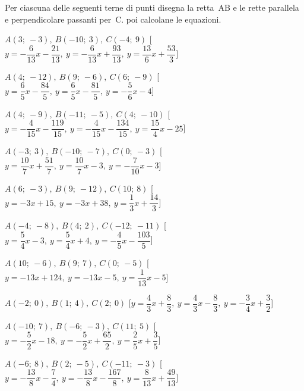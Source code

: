 \begin{esercizio}\label{ese:}
 Per ciascuna delle seguenti terne di 
punti disegna la retta~AB e le rette parallela e perpendicolare passanti 
per~C. poi calcolane le equazioni.
 \begin{enumeratea}
  \item  $A(3;~-3),~B(-10;~3),~C(-4;~9)$ \hfill 
   [$y = -\dfrac{6}{13} x -\dfrac{21}{13},~y = -\dfrac{6}{13} x 
+\dfrac{93}{13},~y = \dfrac{13}{6} x +\dfrac{53}{3}$]
  \item  $A(4;~-12),~B(9;~-6),~C(6;~-9)$ \hfill 
   [$y = \dfrac{6}{5} x -\dfrac{84}{5},~y = \dfrac{6}{5} x -\dfrac{81}{5},~y = 
-\dfrac{5}{6} x -4$]
  \item  $A(4;~-9),~B(-11;~-5),~C(4;~-10)$ \hfill 
   [$y = -\dfrac{4}{15} x -\dfrac{119}{15},~y = -\dfrac{4}{15} x 
-\dfrac{134}{15},~y = \dfrac{15}{4} x -25$]
  \item  $A(-3;~3),~B(-10;~-7),~C(0;~-3)$ \hfill 
   [$y = \dfrac{10}{7} x +\dfrac{51}{7},~y = \dfrac{10}{7} x -3,~y = 
-\dfrac{7}{10} x -3$]
  \item  $A(6;~-3),~B(9;~-12),~C(10;~8)$ \hfill 
   [$y = -3 x +15,~y = -3 x +38,~y = \dfrac{1}{3} x +\dfrac{14}{3}$]
  \item  $A(-4;~-8),~B(4;~2),~C(-12;~-11)$ \hfill 
   [$y = \dfrac{5}{4} x -3,~y = \dfrac{5}{4} x +4,~y = -\dfrac{4}{5} x 
-\dfrac{103}{5}$]
  \item  $A(10;~-6),~B(9;~7),~C(0;~-5)$ \hfill 
   [$y = -13 x +124,~y = -13 x -5,~y = \dfrac{1}{13} x -5$]
  \item  $A(-2;~0),~B(1;~4),~C(2;~0)$ \hfill 
   [$y = \dfrac{4}{3} x +\dfrac{8}{3},~y = \dfrac{4}{3} x -\dfrac{8}{3},~y = 
-\dfrac{3}{4} x +\dfrac{3}{2}$]
  \item  $A(-10;~7),~B(-6;~-3),~C(11;~5)$ \hfill 
   [$y = -\dfrac{5}{2} x -18,~y = -\dfrac{5}{2} x +\dfrac{65}{2},~y = 
\dfrac{2}{5} x +\dfrac{3}{5}$]
  \item  $A(-6;~8),~B(2;~-5),~C(-11;~-3)$ \hfill 
   [$y = -\dfrac{13}{8} x -\dfrac{7}{4},~y = -\dfrac{13}{8} x -\dfrac{167}{8},~y 
= \dfrac{8}{13} x +\dfrac{49}{13}$]

\end{enumeratea}
\end{esercizio}

